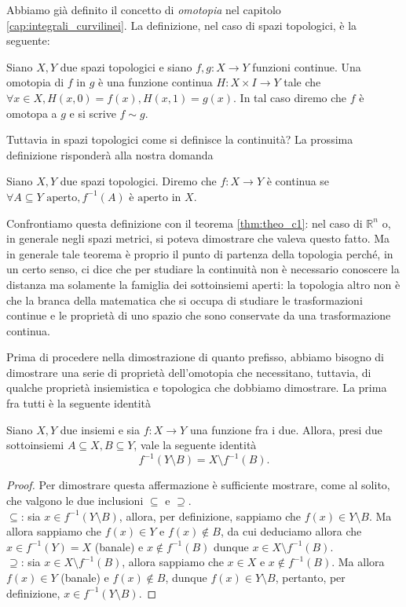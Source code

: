Abbiamo già definito il concetto di \emph{omotopia} nel capitolo \ref{cap:integrali_curvilinei}. La definizione, nel caso di spazi topologici, è la seguente:
\begin{definition}[omotopia]
    Siano $X, Y$ due spazi topologici e siano $f, g : X \to Y$ funzioni continue. Una omotopia di $f$ in $g$ è una funzione continua $H: X \times I \to Y$ tale che $\forall x \in X, H(x, 0) = f(x), H(x, 1) = g(x)$. In tal caso
    diremo che $f$ è omotopa a $g$ e si scrive $f \sim g$.
\end{definition}
Tuttavia in spazi topologici come si definisce la continuità? La prossima definizione risponderà alla nostra domanda
\begin{definition}
    Siano $X, Y$ due spazi topologici. Diremo che $f: X \to Y$ è continua se $\forall A \subseteq Y \text{ aperto}, f^{-1}(A) \text{ è aperto in } X$.
\end{definition}
\begin{remark}
    Confrontiamo questa definizione con il teorema \ref{thm:theo_c1}: nel caso di $\mathbb{R}^n$ o, in generale negli spazi metrici, si poteva dimostrare che valeva questo fatto. Ma in generale tale teorema è proprio il punto di partenza
    della topologia perché, in un certo senso, ci dice che per studiare la continuità non è necessario conoscere la distanza ma solamente la famiglia dei sottoinsiemi aperti: la topologia altro non è che la branca della matematica che si occupa
    di studiare le trasformazioni continue e le proprietà di uno spazio che sono conservate da una trasformazione continua.
\end{remark}
Prima di procedere nella dimostrazione di quanto prefisso, abbiamo bisogno di dimostrare una serie di proprietà dell'omotopia che necessitano, tuttavia, di qualche proprietà insiemistica e topologica che dobbiamo dimostrare. La prima fra tutti è la seguente identità
\begin{lemma}
    Siano $X, Y$ due insiemi e sia $f: X \to Y$ una funzione fra i due. Allora, presi due sottoinsiemi $A \subseteq X, B \subseteq Y$, vale la seguente identità
    \begin{equation*}
        f^{-1}(Y \setminus B) = X \setminus f^{-1}(B).
    \end{equation*}
    \label{lemma:preimage_diff}
\end{lemma}
\begin{proof}
    Per dimostrare questa affermazione è sufficiente mostrare, come al solito, che valgono le due inclusioni $\subseteq$ e $\supseteq$. \\
    $\boxed{\subseteq}$: sia $x \in f^{-1}(Y \setminus B)$, allora, per definizione, sappiamo che $f(x) \in Y \setminus B$. Ma allora sappiamo che $f(x) \in Y$ e $f(x) \not\in B$, da cui deduciamo allora che $x \in f^{-1}(Y) = X$ (banale) e $x \not\in f^{-1}(B)$ dunque $x \in X \setminus f^{-1}(B)$. \\
    $\boxed{\supseteq}$: sia $x \in X \setminus f^{-1}(B)$, allora sappiamo che $x \in X$ e $x \not\in f^{-1}(B)$. Ma allora $f(x) \in Y$ (banale) e $f(x) \not\in B$, dunque $f(x) \in Y \setminus B$, pertanto, per definizione, $x \in f^{-1}(Y \setminus B)$.
\end{proof}
